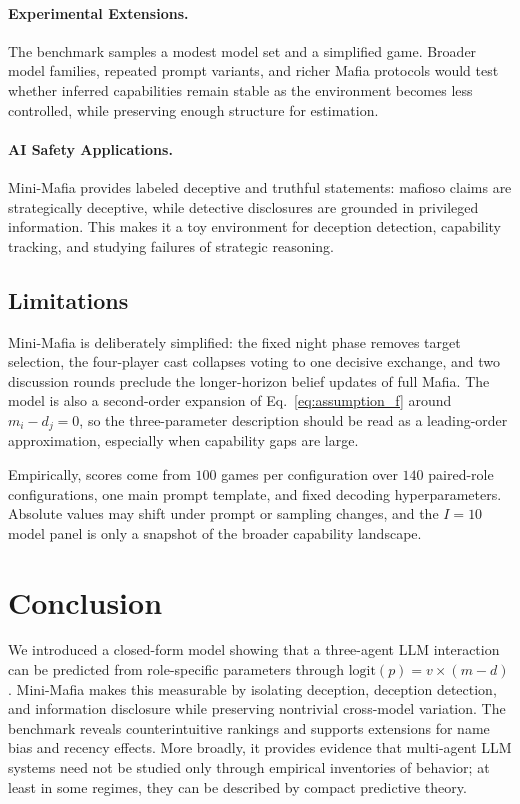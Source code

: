 \documentclass{article}
\begin{document}
\paragraph{Experimental Extensions.} The benchmark samples a modest model set and a simplified game. Broader model families, repeated prompt variants, and richer Mafia protocols would test whether inferred capabilities remain stable as the environment becomes less controlled, while preserving enough structure for estimation.

\paragraph{AI Safety Applications.} Mini-Mafia provides labeled deceptive and truthful statements: mafioso claims are strategically deceptive, while detective disclosures are grounded in privileged information. This makes it a toy environment for deception detection, capability tracking, and studying failures of strategic reasoning.

\subsection{Limitations}
\label{sec:limitations}

Mini-Mafia is deliberately simplified: the fixed night phase removes target selection, the four-player cast collapses voting to one decisive exchange, and two discussion rounds preclude the longer-horizon belief updates of full Mafia. The model is also a second-order expansion of Eq.~\eqref{eq:assumption_f} around $m_i-d_j=0$, so the three-parameter description should be read as a leading-order approximation, especially when capability gaps are large.

Empirically, scores come from $100$ games per configuration over $140$ paired-role configurations, one main prompt template, and fixed decoding hyperparameters. Absolute values may shift under prompt or sampling changes, and the $I=10$ model panel is only a snapshot of the broader capability landscape.

\section{Conclusion}

We introduced a closed-form model showing that a three-agent LLM interaction can be predicted from role-specific parameters through $\text{logit}(p)=v\times(m-d)$. Mini-Mafia makes this measurable by isolating deception, deception detection, and information disclosure while preserving nontrivial cross-model variation. The benchmark reveals counterintuitive rankings and supports extensions for name bias and recency effects. More broadly, it provides evidence that multi-agent LLM systems need not be studied only through empirical inventories of behavior; at least in some regimes, they can be described by compact predictive theory.
\end{document}
